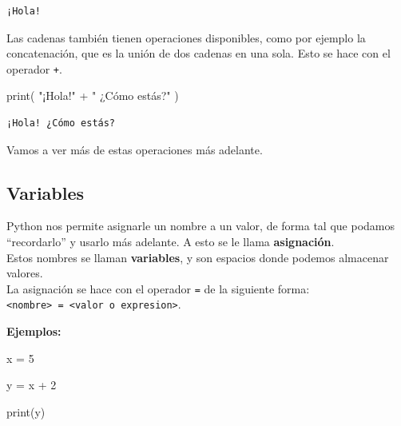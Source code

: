 \documentclass[
  letterpaper,
  DIV=11,
  numbers=noendperiod]{scrreprt}
\newenvironment{Shaded}{\begin{snugshade}}{\end{snugshade}}
\newcommand{\BuiltInTok}[1]{\textcolor[rgb]{0.00,0.23,0.31}{#1}}
\newcommand{\DecValTok}[1]{\textcolor[rgb]{0.68,0.00,0.00}{#1}}
\newcommand{\NormalTok}[1]{\textcolor[rgb]{0.00,0.23,0.31}{#1}}
\newcommand{\OperatorTok}[1]{\textcolor[rgb]{0.37,0.37,0.37}{#1}}
\newcommand{\StringTok}[1]{\textcolor[rgb]{0.13,0.47,0.30}{#1}}
\begin{document}
\begin{verbatim}
¡Hola!
\end{verbatim}

Las cadenas también tienen operaciones disponibles, como por ejemplo la
concatenación, que es la unión de dos cadenas en una sola. Esto se hace
con el operador \texttt{+}.

\begin{Shaded}
\begin{Highlighting}[]
\BuiltInTok{print}\NormalTok{( }\StringTok{"¡Hola!"} \OperatorTok{+} \StringTok{" ¿Cómo estás?"}\NormalTok{ )}
\end{Highlighting}
\end{Shaded}

\begin{verbatim}
¡Hola! ¿Cómo estás?
\end{verbatim}

Vamos a ver más de estas operaciones más adelante.

\subsection{Variables}\label{variables}

Python nos permite asignarle un nombre a un valor, de forma tal que
podamos ``recordarlo'' y usarlo más adelante. A esto se le llama
\textbf{asignación}.\\
Estos nombres se llaman \textbf{variables}, y son espacios donde podemos
almacenar valores.\\

La asignación se hace con el operador \texttt{=} de la siguiente forma:
\texttt{\textless{}nombre\textgreater{}\ =\ \textless{}valor\ o\ expresion\textgreater{}}.

\textbf{Ejemplos:}

\begin{Shaded}
\begin{Highlighting}[]
\NormalTok{x }\OperatorTok{=} \DecValTok{5}
\end{Highlighting}
\end{Shaded}

\begin{Shaded}
\begin{Highlighting}[]
\NormalTok{y }\OperatorTok{=}\NormalTok{ x }\OperatorTok{+} \DecValTok{2}
\end{Highlighting}
\end{Shaded}

\begin{Shaded}
\begin{Highlighting}[]
\BuiltInTok{print}\NormalTok{(y)}
\end{Highlighting}
\end{Shaded}
\end{document}
